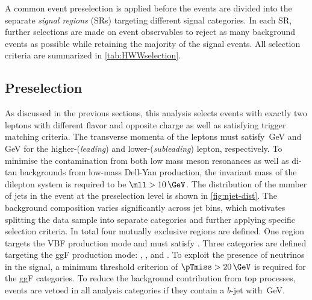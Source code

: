 



A common event preselection is applied before the events are divided into the separate \emph{signal regions} (SRs) targeting different signal categories.
In each SR, further selections are made on event observables to reject as many background events as possible while retaining the majority of the signal events.
All selection criteria are summarized in \cref{tab:HWWselection}. 

\begin{table}[!ht]
    \centering
    \caption{
    Event selection criteria used to define the SRs in the \hwwenmn\ analysis. The definitions of the variables can be found in the text.
    \label{tab:HWWselection}
    }
    \scalebox{0.76}{
    
    }
\end{table}

\subsection{Preselection}
\label{subsec:preselection}
As discussed in the previous sections, this analysis selects events with exactly two leptons with different flavor and opposite charge as well as satisfying trigger matching criteria.
The transverse momenta of the leptons must satisfy \,GeV and \,GeV for the higher-\pT (\emph{leading}) and lower-\pT (\emph{subleading}) lepton, respectively.
To minimise the contamination from both low mass meson resonances as well as di-tau backgrounds from low-mass Dell-Yan production, the invariant mass of the dilepton system is required to be $\mll > 10\,\GeV$.
The distribution of the number of jets in the event at the preselection level is shown in \cref{fig:njet-dist}.
The background composition varies significantly across jet bins, which motivates splitting the data sample into separate \Njet categories and further applying specific selection criteria.
In total four mutually exclusive regions are defined.
One region targets the VBF production mode and must satisfy \TwoJet.
Three categories are defined targeting the ggF production mode: \ZeroJet, \OneJet, and \TwoJet.
To exploit the presence of neutrinos in the signal, a minimum threshold criterion of $\pTmiss > 20\,\GeV$ is required for the ggF categories.
To reduce the background contribution from top processes, events are vetoed in all analysis categories if they contain a $b$-jet with \,GeV.

